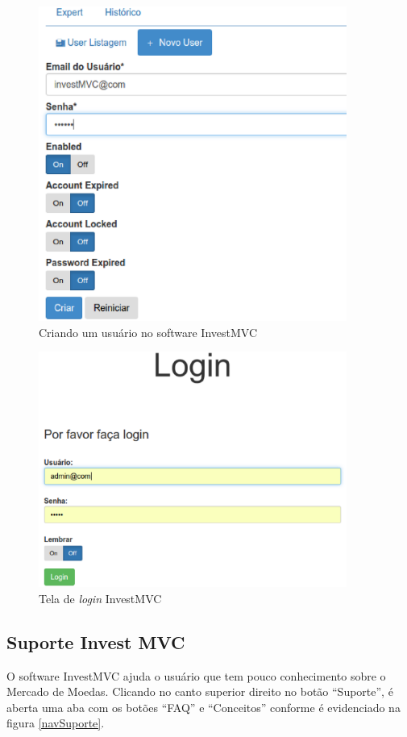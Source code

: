\begin{figure}[H]
\centering
\includegraphics[width=0.9\textwidth]{figuras/novoUser}
\caption{Criando um usuário no software InvestMVC}
\label{telaInicial}
\end{figure}

\begin{figure}[H]
\centering
\includegraphics[width=0.9\textwidth]{figuras/login}
\caption{Tela de \textit{login} InvestMVC}
\label{login}
\end{figure}

\subsection{Suporte Invest MVC}
O software InvestMVC ajuda o usuário que tem pouco conhecimento sobre o Mercado de Moedas. Clicando no canto superior direito no botão “Suporte”, é aberta uma aba com os botões “FAQ” e “Conceitos” conforme é evidenciado na figura \ref{navSuporte}.

